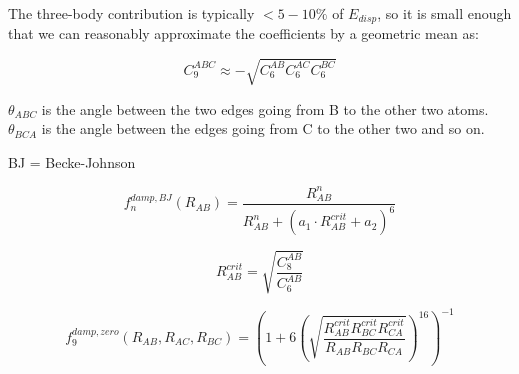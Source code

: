 \vspace{10pt}
\noindent
The three-body contribution is typically \(<5-10\%\) of \(E_{disp}\), so it is small enough that we can reasonably approximate the coefficients by a geometric mean as:

\begin{equation}
  C_9^{ABC} \approx -\sqrt{C_6^{AB} C_6^{AC} C_6^{BC}}
\end{equation}


\vspace{10pt}
\noindent
\(\theta_{ABC}\) is the angle between the two edges going from B to the other two atoms. \(\theta_{BCA}\) is the angle between the edges going from C to the other two and so on.


\vspace{10pt}
\noindent
BJ = Becke-Johnson

\begin{equation}
  f_n^{damp,BJ}(R_{AB}) = \frac{R_{AB}^n}{R_{AB}^n + (a_1 \cdot R_{AB}^{crit} + a_2)^6}
\end{equation}

\begin{equation}
  R_{AB}^{crit} = \sqrt{\frac{C_8^{AB}}{C_6^{AB}}}
\end{equation}


\begin{equation}
  f_9^{damp,zero}(R_{AB}, R_{AC}, R_{BC}) = \left(1 + 6 \left(\sqrt{\frac{R_{AB}^{crit} R_{BC}^{crit} R_{CA}^{crit}}{R_{AB} R_{BC} R_{CA}}}\right)^{16}\right)^{-1}
\end{equation}
